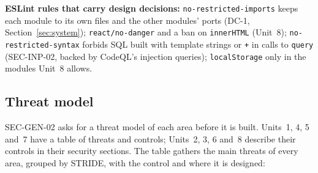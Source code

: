 \documentclass[11pt,a4paper]{article}
\begin{document}
\textbf{ESLint rules that carry design decisions:} \texttt{no-restricted-imports} keeps each module to its own files and the other modules' ports (DC-1, Section~\ref{sec:system}); \texttt{react/no-danger} and a ban on \texttt{innerHTML} (Unit~8); \texttt{no-restricted-syntax} forbids SQL built with template strings or \texttt{+} in calls to \texttt{query} (SEC-INP-02, backed by CodeQL's injection queries); \texttt{localStorage} only in the modules Unit~8 allows.

\subsection{Threat model}
\label{sec:threats}
SEC-GEN-02 asks for a threat model of each area before it is built. Units~1, 4, 5 and~7 have a table of threats and controls; Units~2, 3, 6 and~8 describe their controls in their security sections. The table gathers the main threats of every area, grouped by STRIDE, with the control and where it is designed:
\end{document}
